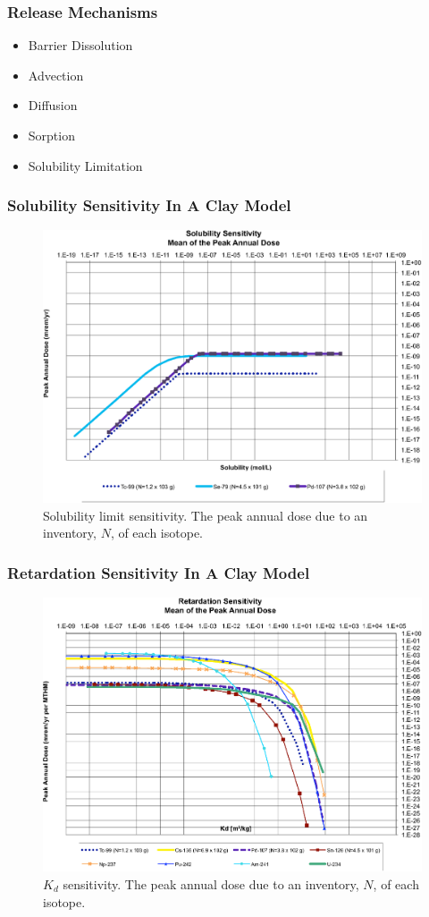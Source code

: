
\begin{frame}[ctb!]
  \frametitle{Release Mechanisms}
  \begin{itemize} 
  \item Barrier Dissolution
  \item Advection
  \item Diffusion
  \item Sorption
  \item Solubility Limitation
  \end{itemize}
\end{frame}

\begin{frame}
\frametitle{Solubility Sensitivity In A Clay Model}
\begin{figure}[ht]
  \centering
  \includegraphics[width=0.7\linewidth]{Solubility_Summary.eps}
  \caption{Solubility limit sensitivity. The peak annual dose due to an 
  inventory, $N$, of each isotope.}
  \label{fig:SolSum}
\end{figure}
\end{frame}

\begin{frame}[ctb]
\frametitle{Retardation Sensitivity In A Clay Model}
\begin{figure}[ht]
  \centering
  \includegraphics[width=\linewidth]{Partitioning_Summary.eps}
  \caption{$K_d$ sensitivity.  The peak annual dose due to an inventory, 
  $N$, of each isotope.}
  \label{fig:KdSum}
\end{figure}
\end{frame}

